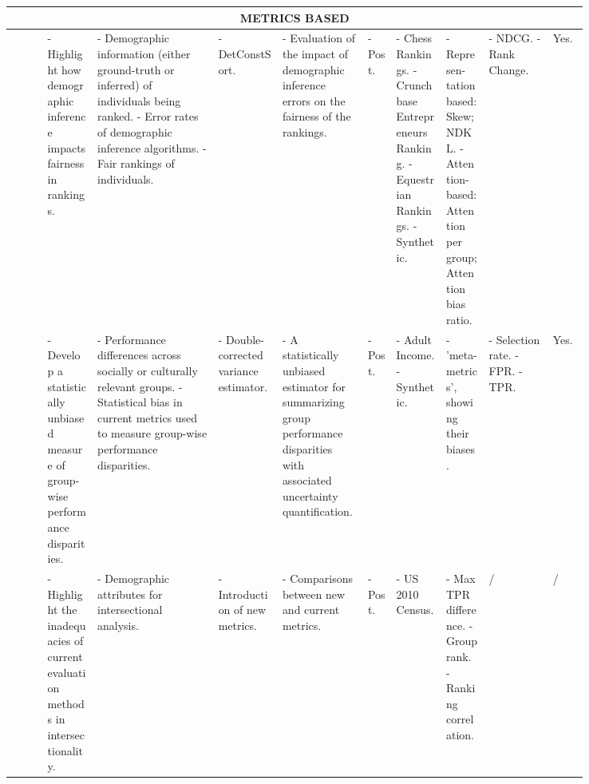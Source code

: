 \begin{landscape}
\begin{longtable}{|p{0.05\linewidth}|p{0.077\linewidth}|p{0.171\linewidth}|p{0.092\linewidth}|p{0.121\linewidth}|p{0.042\linewidth}|p{0.077\linewidth}|p{0.06\linewidth}|p{0.094\linewidth}|p{0.052\linewidth}|}
\multicolumn{10}{|c|}{\textbf{METRICS BASED}} \\ \hline
\cite{ghosh2021fair} %
& - Highlight how demographic inference impacts fairness in rankings. 
& - Demographic information (either ground-truth or inferred) of individuals being ranked.\newline
- Error rates of demographic inference algorithms.\newline
- Fair rankings of individuals. 
& - DetConstSort. \newline
& - Evaluation of the impact of demographic inference errors on the fairness of the rankings. 
& - Post. 
& - Chess Rankings.\newline
- Crunchbase Entrepreneurs Ranking.\newline
- Equestrian Rankings.\newline
- Synthetic.  
& - Represen-\newline tation based: Skew; NDKL.\newline
- Attention-based: Attention per group; Attention bias ratio. 
& - NDCG.\newline
- Rank Change. 
& Yes. \\ \hline

\cite{lum2022biasing} %
& - Develop a statistically unbiased measure of group-wise performance disparities. 
& - Performance differences across socially or culturally relevant groups.\newline
- Statistical bias in current metrics used to measure group-wise performance disparities.
& - Double-corrected variance estimator. 
& - A statistically unbiased estimator for summarizing group performance disparities with associated uncertainty quantification. 
& - Post. 
& - Adult Income.\newline
- Synthetic.  
& - 'meta-metrics', showing their biases. 
& - Selection rate.\newline
- FPR.\newline
- TPR. 
& Yes. \\ \hline

\cite{lum2022biasing} %
& - Highlight the inadequacies of current evaluation methods in intersectionality. 
& - Demographic attributes for intersectional analysis. 
& - Introduction of new metrics. 
& - Comparisons between new and current metrics. 
& - Post. 
& - US 2010 Census.  
& - Max TPR difference.\newline
- Group rank. \newline
- Ranking correlation.
& / 
& / \\ \hline


\end{longtable}
\end{landscape}
